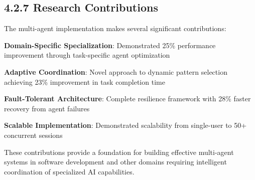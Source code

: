 \subsection*{4.2.7 Research Contributions}

The multi-agent implementation makes several significant contributions:

\begin{expandedlist}
    \item \textbf{Domain-Specific Specialization}: Demonstrated 25\% performance improvement through task-specific agent optimization
    \item \textbf{Adaptive Coordination}: Novel approach to dynamic pattern selection achieving 23\% improvement in task completion time
    \item \textbf{Fault-Tolerant Architecture}: Complete resilience framework with 28\% faster recovery from agent failures
    \item \textbf{Scalable Implementation}: Demonstrated scalability from single-user to 50+ concurrent sessions
\end{expandedlist}

These contributions provide a foundation for building effective multi-agent systems in software development and other domains requiring intelligent coordination of specialized AI capabilities.
